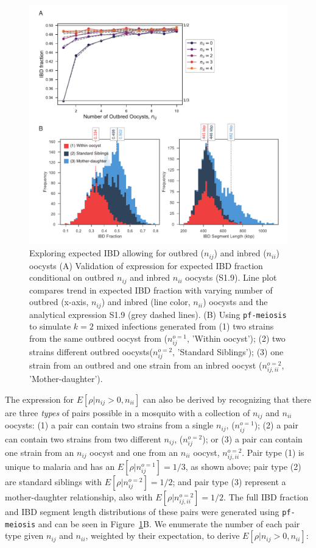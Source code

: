 \documentclass[9pt]{article}
\begin{document}
\begin{figure}[ht]
  \centering{}
  \includegraphics[width = .85\textwidth]{supFigures/supp-Fig2.pdf}
  \caption{Exploring expected IBD allowing for outbred ($n_{ij}$) and inbred ($n_{ii}$) oocysts (A) Validation of expression for expected IBD fraction conditional on outbred $n_{ij}$ and inbred $n_{ii}$ oocysts (S1.9). Line plot compares trend in expected IBD fraction with varying number of outbred (x-axis, $n_{ij}$) and inbred (line color, $n_{ii}$) oocysts and the analytical expression S1.9 (grey dashed lines). (B) Using \texttt{pf-meiosis} to simulate $k=2$ mixed infections generated from (1) two strains from the same outbred oocyst from ($n^{o=1}_{ij}$, 'Within oocyst'); (2) two strains different outbred oocysts($n^{o=2}_{ij}$, 'Standard Siblings'); (3) one strain from an outbred and one strain from an inbred oocyst ($n^{o=2}_{ij, ii}$, 'Mother-daughter').} \label{fig:validinbred}
\end{figure}

The expression for $E[\rho|n_{ij} > 0, n_{ii}]$ can also be derived by recognizing that there are three \textit{types} of pairs possible in a mosquito with a collection of $n_{ij}$ and $n_{ii}$ oocysts: (1) a pair can contain two strains from a single $n_{ij}$, ($n^{o=1}_{ij}$); (2) a pair can contain two strains from two different $n_{ij}$, ($n^{o=2}_{ij}$); or (3) a pair can contain one strain from an $n_{ij}$ oocyst and one from an $n_{ii}$ oocyst, $n^{o=2}_{ij, ii}$. Pair type (1) is unique to malaria and has an  $E[\rho|n^{o=1}_{ij}]=1/3$, as shown above; pair type (2) are standard siblings with $E[\rho|n^{o=2}_{ij}]=1/2$; and pair type (3) represent a mother-daughter relationship, also with $E[\rho|n^{o=2}_{ij, ii}]=1/2$. The full IBD fraction and IBD segment length distributions of these pairs were generated using \texttt{pf-meiosis} and can be seen in Figure~\ref{fig:validinbred}B. We enumerate the number of each pair type given $n_{ij}$ and $n_{ii}$, weighted by their expectation, to derive $E[\rho|n_{ij} > 0, n_{ii}]$:
\end{document}
